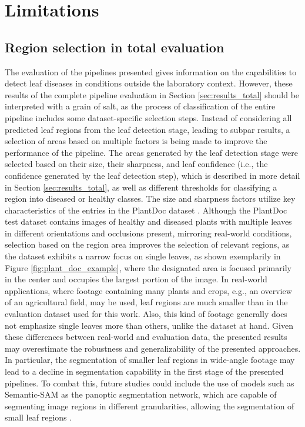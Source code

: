 \documentclass[draft,final]{vutinfth} %
\begin{document}
\section{Limitations}
\subsection{Region selection in total evaluation} \label{sec:lim_selection}
The evaluation of the pipelines presented gives information on the capabilities to detect leaf diseases in conditions outside the laboratory context.
However, these results of the complete pipeline evaluation in Section \ref{sec:results_total} should be interpreted with a grain of salt, as the process of classification of the entire pipeline includes some dataset-specific selection steps. Instead of considering all predicted leaf regions from the leaf detection stage, leading to subpar results, a selection of areas based on multiple factors is being made to improve the performance of the pipeline. The areas generated by the leaf detection stage were selected based on their size, their sharpness, and leaf confidence (i.e., the confidence generated by the leaf detection step), which is described in more detail in Section \ref{sec:results_total}, as well as different thresholds for classifying a region into diseased or healthy classes. The size and sharpness factors utilize key characteristics of the entries in the PlantDoc dataset \cite{singh_plantdoc_2020}. Although the PlantDoc test dataset \cite{singh_plantdoc_2020} contains images of healthy and diseased plants with multiple leaves in different orientations and occlusions present, mirroring real-world conditions, selection based on the region area improves the selection of relevant regions, as the dataset exhibits a narrow focus on single leaves, as shown exemplarily in Figure \ref{fig:plant_doc_example}, where the designated area is focused primarily in the center and occupies the largest portion of the image.
In real-world applications, where footage containing many plants and crops, e.g., an overview of an agricultural field, may be used, leaf regions are much smaller than in the evaluation dataset used for this work. Also, this kind of footage generally does not emphasize single leaves more than others, unlike the dataset at hand. Given these differences between real-world and evaluation data, the presented results may overestimate the robustness and generalizability of the presented approaches. In particular, the segmentation of smaller leaf regions in wide-angle footage may lead to a decline in segmentation capability in the first stage of the presented pipelines. To combat this, future studies could include the use of models such as Semantic-SAM as the panoptic segmentation network, which are capable of segmenting image regions in different granularities, allowing the segmentation of small leaf regions \cite{li_semantic-sam_2023}.
\end{document}
